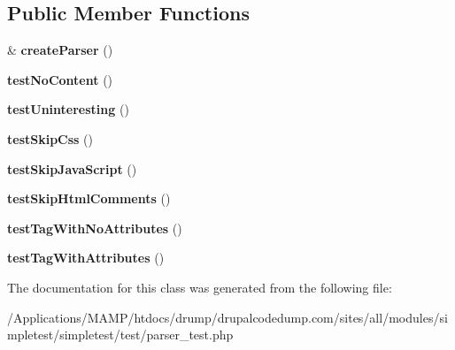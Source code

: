 \subsection*{Public Member Functions}
\begin{DoxyCompactItemize}
\item 
\hypertarget{class_test_of_simple_html_lexer_a3dcd4ea3f14d43852bb8448d90418875}{
\& {\bfseries createParser} ()}
\label{class_test_of_simple_html_lexer_a3dcd4ea3f14d43852bb8448d90418875}

\item 
\hypertarget{class_test_of_simple_html_lexer_acf537bde6795e4e3254cc4b967e11c79}{
{\bfseries testNoContent} ()}
\label{class_test_of_simple_html_lexer_acf537bde6795e4e3254cc4b967e11c79}

\item 
\hypertarget{class_test_of_simple_html_lexer_aba61a84a4b64310f29e5e286e212897e}{
{\bfseries testUninteresting} ()}
\label{class_test_of_simple_html_lexer_aba61a84a4b64310f29e5e286e212897e}

\item 
\hypertarget{class_test_of_simple_html_lexer_a7ec52bb772599221dbb7b340fa6f3c1c}{
{\bfseries testSkipCss} ()}
\label{class_test_of_simple_html_lexer_a7ec52bb772599221dbb7b340fa6f3c1c}

\item 
\hypertarget{class_test_of_simple_html_lexer_a17f07ee2caca55b4cf1971b638f0f430}{
{\bfseries testSkipJavaScript} ()}
\label{class_test_of_simple_html_lexer_a17f07ee2caca55b4cf1971b638f0f430}

\item 
\hypertarget{class_test_of_simple_html_lexer_af8696568a29ddde6d7b8b00e648ab9a1}{
{\bfseries testSkipHtmlComments} ()}
\label{class_test_of_simple_html_lexer_af8696568a29ddde6d7b8b00e648ab9a1}

\item 
\hypertarget{class_test_of_simple_html_lexer_a7a70dffbee6e7218c6f4023a4983c245}{
{\bfseries testTagWithNoAttributes} ()}
\label{class_test_of_simple_html_lexer_a7a70dffbee6e7218c6f4023a4983c245}

\item 
\hypertarget{class_test_of_simple_html_lexer_a195f121f290c690c0dede80abb5aca60}{
{\bfseries testTagWithAttributes} ()}
\label{class_test_of_simple_html_lexer_a195f121f290c690c0dede80abb5aca60}

\end{DoxyCompactItemize}


The documentation for this class was generated from the following file:\begin{DoxyCompactItemize}
\item 
/Applications/MAMP/htdocs/drump/drupalcodedump.com/sites/all/modules/simpletest/simpletest/test/parser\_\-test.php\end{DoxyCompactItemize}
